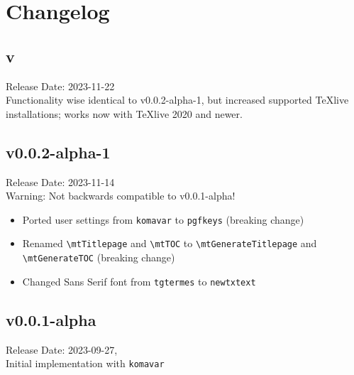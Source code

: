 \chapter{Changelog}
	\section{v\releaseVersion}
		Release Date: 2023-11-22\\
		Functionality wise identical to v0.0.2-alpha-1, but increased supported TeXlive installations; works now with TeXlive 2020 and newer.
		
	\section{v0.0.2-alpha-1}
		Release Date: 2023-11-14\\
		Warning: Not backwards compatible to v0.0.1-alpha!
		\begin{itemize}
			\item Ported user settings from \verb|komavar| to \verb|pgfkeys| (breaking change)
			\item Renamed \verb|\mtTitlepage| and \verb|\mtTOC| to \verb|\mtGenerateTitlepage| and\\ \verb|\mtGenerateTOC| (breaking change)
			\item Changed Sans Serif font from \verb|tgtermes| to \verb|newtxtext| 
		\end{itemize}
	
	\section{v0.0.1-alpha}
		Release Date: 2023-09-27,\\
		Initial implementation with \verb|komavar|